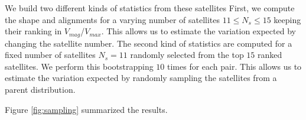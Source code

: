 \documentclass[a4paper,fleqn,usenatbib]{mnras}
\begin{document}
We build two different kinds of statistics from these satellites
First, we compute the shape and alignments for a varying number of
satellites $11\leq N_{s}\leq 15$ keeping their ranking in
$V_{mag}$/$V_{max}$. 
This allows us to estimate the variation expected by changing the
satellite number. 
The second kind of statistics are computed for a fixed number of
satellites $N_{s}=11$ randomly selected from the top $15$ ranked
satellites. 
We perform this bootstrapping $10$ times for each pair. 
This allows us to estimate the variation expected by randomly sampling
the satellites from a parent distribution.

Figure \ref{fig:sampling} summarized the results. 



\end{document}
